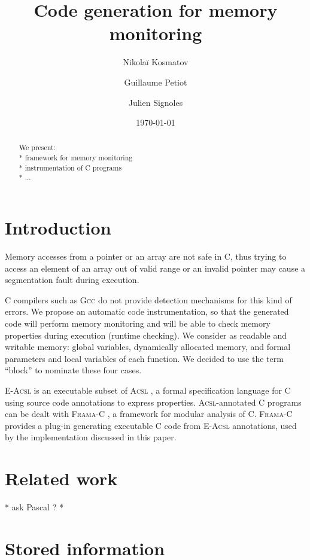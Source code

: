 \documentclass[a4paper,11pt]{article}
\begin{document}
 
\title{Code generation for memory monitoring}
\author{Nikolaï Kosmatov \and Guillaume Petiot \and Julien Signoles}
\date{\today}
 
\maketitle



\begin{abstract}
We present:\\
* framework for memory monitoring\\
* instrumentation of {C} programs\\
* ...
\end{abstract}


\section{Introduction}


Memory accesses from a pointer or an array are not safe in C, thus trying to
access an element of an array out of valid range or an invalid pointer may cause
a segmentation fault during execution.

C compilers such as \textsc{Gcc} do not provide detection mechanisms for this
kind of errors. We propose an automatic code instrumentation, so that the
generated code will perform memory monitoring and will be able to check
memory properties during execution (runtime checking).
We consider as readable and writable memory: global variables, dynamically
allocated memory, and formal parameters and local variables of each function. We
decided to use the term ``block'' to nominate these four cases.

\textsc{E-Acsl} is an executable subset of \textsc{Acsl} \cite{ACSL}, a formal
specification language for C using source code annotations to express
properties. \textsc{Acsl}-annotated C programs can be dealt with
\textsc{Frama-C} \cite{Frama-C}, a framework for modular analysis of C.
\textsc{Frama-C} provides a plug-in generating executable C code from
\textsc{E-Acsl} annotations, used by the implementation discussed in this paper.


\section{Related work}

* ask Pascal ? *

\section{Stored information}
\end{document}
